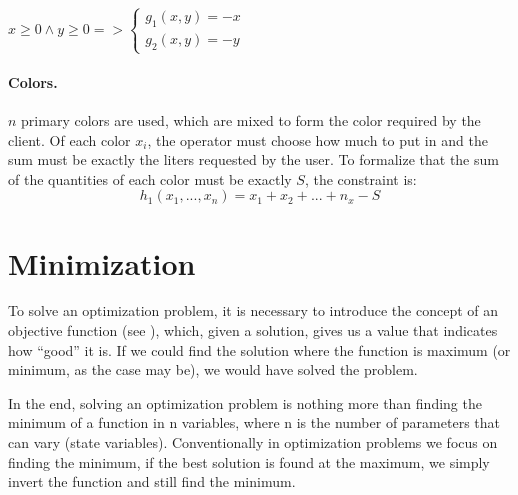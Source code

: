 \begin{minipage}{0.49\linewidth}
    \center
    \( 
        x \geq 0 \land y \geq 0 =>  
        \left\{
        \begin{array}{l}
            g_1(x, y) = -x \\
            g_2(x, y) = -y
        \end{array}\right.
    \)
\end{minipage}
\begin{minipage}{0.49\linewidth}
    \center
\end{minipage}

\paragraph{Colors.} \( n \) primary colors are used, which are mixed to form the color required by the client. Of each color \( x_i \), the operator must choose how much to put in and the sum must be exactly the liters requested by the user. To formalize that the sum of the quantities of each color must be exactly \( S \), the constraint is:
\[ h_1(x_1, ..., x_n) = x_1 + x_2 + ... + n_x - S \]



\section{Minimization}
\label{sec:op.minimization}

To solve an optimization problem, it is necessary to introduce the concept of an objective function (see ), which, given a solution, gives us a value that indicates how ``good'' it is. If we could find the solution where the function is maximum (or minimum, as the case may be), we would have solved the problem. 

In the end, solving an optimization problem is nothing more than finding the minimum of a function in n variables, where n is the number of parameters that can vary (state variables).
Conventionally in optimization problems we focus on finding the minimum, if the best solution is found at the maximum, we simply invert the function and still find the minimum.

